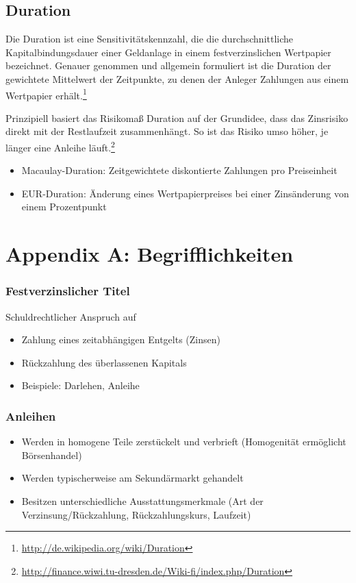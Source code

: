 \subsection{Duration}
Die Duration ist eine Sensitivitätskennzahl, die die durchschnittliche Kapitalbindungsdauer einer Geldanlage in einem festverzinslichen Wertpapier bezeichnet. Genauer genommen und allgemein formuliert ist die Duration der gewichtete Mittelwert der Zeitpunkte, zu denen der Anleger Zahlungen aus einem Wertpapier erhält.\footnote{\url{http://de.wikipedia.org/wiki/Duration}}

Prinzipiell basiert das Risikomaß Duration auf der Grundidee, dass das Zinsrisiko direkt mit der Restlaufzeit zusammenhängt. So ist das Risiko umso höher, je länger eine Anleihe läuft.\footnote{\url{http://finance.wiwi.tu-dresden.de/Wiki-fi/index.php/Duration}}
\begin{itemize}
	\item Macaulay-Duration: Zeitgewichtete diskontierte Zahlungen pro Preiseinheit
	\item EUR-Duration: Änderung eines Wertpapierpreises bei einer Zinsänderung von einem Prozentpunkt
\end{itemize}



\section{Appendix A: Begrifflichkeiten}

\subsubsection{Festverzinslicher Titel}
Schuldrechtlicher Anspruch auf
\begin{itemize}
	\item Zahlung eines zeitabhängigen Entgelts (Zinsen)
	\item Rückzahlung des überlassenen Kapitals
	\item Beispiele: Darlehen, Anleihe
\end{itemize}

\subsubsection{Anleihen}
\begin{itemize}
	\item Werden in homogene Teile zerstückelt und verbrieft (Homogenität ermöglicht Börsenhandel)
	\item Werden typischerweise am Sekundärmarkt gehandelt
	\item Besitzen unterschiedliche Ausstattungsmerkmale (Art der Verzinsung/Rückzahlung, Rückzahlungskurs, Laufzeit)
\end{itemize}

